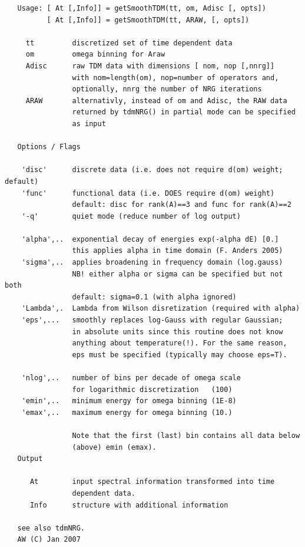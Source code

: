 \documentclass[twoside,12pt]{article}
\begin{document}
\begin{verbatim}
   Usage: [ At [,Info]] = getSmoothTDM(tt, om, Adisc [, opts])
          [ At [,Info]] = getSmoothTDM(tt, ARAW, [, opts])
 
     tt         discretized set of time dependent data
     om         omega binning for Araw
     Adisc      raw TDM data with dimensions [ nom, nop [,nnrg]]
                with nom=length(om), nop=number of operators and,
                optionally, nnrg the number of NRG iterations
     ARAW       alternativly, instead of om and Adisc, the RAW data
                returned by tdmNRG() in partial mode can be specified
                as input
 
   Options / Flags
 
    'disc'      discrete data (i.e. does not require d(om) weight; default)
    'func'      functional data (i.e. DOES require d(om) weight)
                default: disc for rank(A)==3 and func for rank(A)==2
    '-q'        quiet mode (reduce number of log output)
 
    'alpha',..  exponential decay of energies exp(-alpha dE) [0.]
                this applies alpha in time domain (F. Anders 2005)
    'sigma',..  applies broadening in frequency domain (log.gauss)
                NB! either alpha or sigma can be specified but not both
                default: sigma=0.1 (with alpha ignored)
    'Lambda',.  Lambda from Wilson disretization (required with alpha)
    'eps',...   smoothly replaces log-Gauss with regular Gaussian;
                in absolute units since this routine does not know
                anything about temperature(!). For the same reason,
                eps must be specified (typically may choose eps=T).
 
    'nlog',..   number of bins per decade of omega scale
                for logarithmic discretization   (100)
    'emin',..   minimum energy for omega binning (1E-8)
    'emax',..   maximum energy for omega binning (10.)
 
                Note that the first (last) bin contains all data below
                (above) emin (emax).
   Output
 
      At        input spectral information transformed into time
                dependent data.
      Info      structure with additional information
 
   see also tdmNRG.
   AW (C) Jan 2007
\end{verbatim}

\pagebreak[3]
\end{document}
